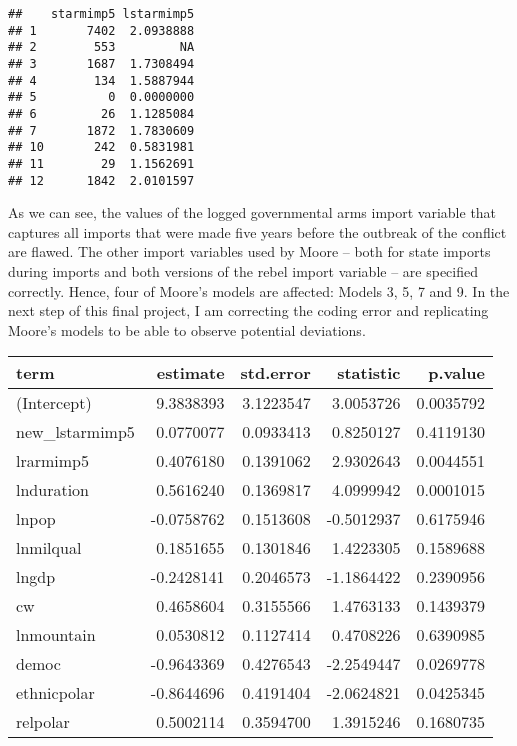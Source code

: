 \documentclass[
]{article}
\begin{document}
\begin{verbatim}
##    starmimp5 lstarmimp5
## 1       7402  2.0938888
## 2        553         NA
## 3       1687  1.7308494
## 4        134  1.5887944
## 5          0  0.0000000
## 6         26  1.1285084
## 7       1872  1.7830609
## 10       242  0.5831981
## 11        29  1.1562691
## 12      1842  2.0101597
\end{verbatim}

As we can see, the values of the logged governmental arms import
variable that captures all imports that were made five years before the
outbreak of the conflict are flawed. The other import variables used by
Moore -- both for state imports during imports and both versions of the
rebel import variable -- are specified correctly. Hence, four of Moore's
models are affected: Models 3, 5, 7 and 9. In the next step of this
final project, I am correcting the coding error and replicating Moore's
models to be able to observe potential deviations.

\begin{tabular}{l|r|r|r|r}
\hline
term & estimate & std.error & statistic & p.value\\
\hline
(Intercept) & 9.3838393 & 3.1223547 & 3.0053726 & 0.0035792\\
\hline
new\_lstarmimp5 & 0.0770077 & 0.0933413 & 0.8250127 & 0.4119130\\
\hline
lrarmimp5 & 0.4076180 & 0.1391062 & 2.9302643 & 0.0044551\\
\hline
lnduration & 0.5616240 & 0.1369817 & 4.0999942 & 0.0001015\\
\hline
lnpop & -0.0758762 & 0.1513608 & -0.5012937 & 0.6175946\\
\hline
lnmilqual & 0.1851655 & 0.1301846 & 1.4223305 & 0.1589688\\
\hline
lngdp & -0.2428141 & 0.2046573 & -1.1864422 & 0.2390956\\
\hline
cw & 0.4658604 & 0.3155566 & 1.4763133 & 0.1439379\\
\hline
lnmountain & 0.0530812 & 0.1127414 & 0.4708226 & 0.6390985\\
\hline
democ & -0.9643369 & 0.4276543 & -2.2549447 & 0.0269778\\
\hline
ethnicpolar & -0.8644696 & 0.4191404 & -2.0624821 & 0.0425345\\
\hline
relpolar & 0.5002114 & 0.3594700 & 1.3915246 & 0.1680735\\
\hline
\end{tabular}
\end{document}
